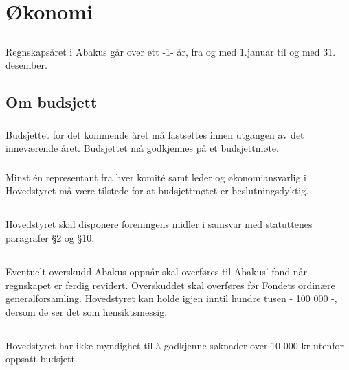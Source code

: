 \section{Økonomi}

\subsection{}
Regnskapsåret i Abakus går over ett -1- år, fra og med 1.januar til og med 31. desember.

\subsection{Om budsjett}
\subsubsection{}
Budsjettet for det kommende året må fastsettes innen utgangen av det inneværende året. Budsjettet må godkjennes på et budsjettmøte.

\subsubsection{}
Minst én representant fra hver komité samt leder og økonomiansvarlig i Hovedstyret må være tilstede for at budsjettmøtet er beslutningsdyktig.

\subsection{}
Hovedstyret skal disponere foreningens midler i samsvar med statuttenes
paragrafer §2 og §10.

\subsection{}
Eventuelt overskudd Abakus oppnår skal overføres til Abakus’ fond når regnskapet er ferdig revidert.
Overskuddet skal overføres før Fondets ordinære generalforsamling.
Hovedstyret kan holde igjen inntil hundre tusen - 100 000 -, dersom de ser det som hensiktsmessig.

\subsection{}
Hovedstyret har ikke myndighet til å godkjenne søknader over 10 000 kr utenfor
oppsatt budsjett.
